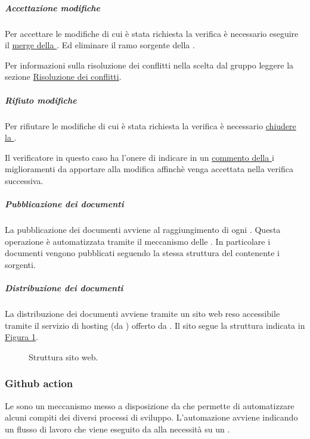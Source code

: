 \subparagraph{Accettazione modifiche}
\label{subpar:accettazione_modifiche}
Per accettare le modifiche di cui è stata richiesta la verifica è necessario eseguire il \hyperref[item:approvazione_pull_request]{merge della }.
Ed eliminare il ramo sorgente della .

Per informazioni sulla risoluzione dei conflitti nella  scelta dal gruppo leggere la sezione \hyperref[subpar:risoluzione_dei_conflitti]{Risoluzione dei conflitti}.


\subparagraph{Rifiuto modifiche}
\label{subpar:rifiuto_modifiche}
Per rifiutare le modifiche di cui è stata richiesta la verifica è necessario \hyperref[item:chiusura_pull_request]{chiudere la }.

Il verificatore in questo caso ha l'onere di indicare in un \hyperref[item:commentare_issue]{commento della } i miglioramenti da apportare alla modifica affinchè venga accettata nella verifica successiva.

\subparagraph{Pubblicazione dei documenti}
La pubblicazione dei documenti avviene al raggiungimento di ogni .
Questa operazione è automatizzata tramite il meccanismo delle \hyperref[subsubsec:github_action]{}.
In particolare i documenti vengono pubblicati seguendo la stessa struttura del  contenente i sorgenti.

\subparagraph{Distribuzione dei documenti}
La distribuzione dei documenti avviene tramite un sito web reso accessibile tramite il servizio di hosting (da ) offerto da .
Il sito segue la struttura indicata in \hyperref[fig:sito_docs]{Figura \ref{fig:sito_docs}}.

\begin{figure}[!h]
\caption{Struttura sito web.}
\label{fig:sito_docs}
\end{figure}

\subsubsection{Github action}
\label{subsubsec:github_action}
Le  sono un meccanismo messo a disposizione da  che permette di automatizzare alcuni compiti dei diversi processi di sviluppo.
L'automazione avviene indicando un flusso di lavoro che viene eseguito da  alla necessità su un .

